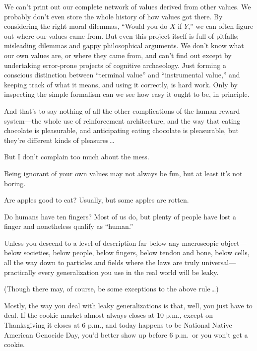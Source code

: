  We can't print out our complete network of values
derived from other values. We probably don't even store
the whole history of how values got there. By considering the right
moral dilemmas, ``Would you do $X$ if
$Y$,'' we can often figure out where our values came
from. But even this project itself is full of pitfalls; misleading
dilemmas and gappy philosophical arguments. We don't
know what our own values are, or where they came from, and
can't find out except by undertaking error-prone
projects of cognitive archaeology. Just forming a conscious distinction
between ``terminal value'' and
``instrumental value,'' and keeping
track of what it means, and using it correctly, is hard work. Only by
inspecting the simple formalism can we see how easy it ought to be, in
principle.


 And that's to say nothing of all the other
complications of the human reward system---the whole use of
reinforcement architecture, and the way that eating chocolate is
pleasurable, and anticipating eating chocolate is pleasurable, but
they're different kinds of pleasures\,\ldots


 But I don't complain too much about the mess.


 Being ignorant of your own values may not always be fun, but at
least it's not boring.

\myendsectiontext



 Are apples good to eat? Usually, but some apples are rotten. 


 Do humans have ten fingers? Most of us do, but plenty of people
have lost a finger and nonetheless qualify as
``human.''


 Unless you descend to a level of description far below any
macroscopic object---below societies, below people, below fingers,
below tendon and bone, below cells, all the way down to particles and
fields where the laws are truly universal---practically every
generalization you use in the real world will be leaky.


 (Though there may, of course, be some exceptions to the above rule\,\ldots)


 Mostly, the way you deal with leaky generalizations is that, well,
you just have to deal. If the cookie market almost always closes at 10
p.m., except on Thanksgiving it closes at 6 p.m., and today happens to
be National Native American Genocide Day, you'd better
show up before 6 p.m.~or you won't get a cookie.



